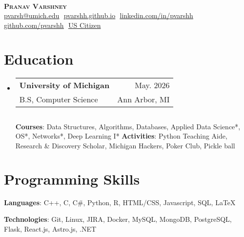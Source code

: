 \documentclass[letterpaper,11pt]{article}
\makeatletter
\newcommand{\resumeSubheading}[4]{
  \vspace{-2pt}\item
    \begin{tabular*}{0.97\textwidth}[t]{l@{\extracolsep{\fill}}r}
      \textbf{#1} & #2 \\
      {\small#3} & {\small #4} \\
    \end{tabular*}\vspace{-7pt}
}
\newcommand{\resumeSubHeadingListStart}{\begin{itemize}[leftmargin=0.15in, 
label={}]}
\newcommand{\resumeSubHeadingListEnd}{\end{itemize}}
\makeatother
\begin{document}

\begin{center}
\textbf{} \\ \vspace{2pt}
    \textbf{\Huge \scshape Pranav Varshney} \\ \vspace{4pt}
    \small 
    \href{mailto:pvarsh@umich.edu}
    {\underline{pvarsh@umich.edu}} $ $
    \href{https://portfolio-pvarshhs-projects.vercel.app/}
    {\underline{pvarshh.github.io}} $  $
    \href{https://linkedin.com/in/pvarshh}
    {\underline{linkedin.com/in/pvarshh}} $ $
    \href{https://github.com/pvarshh}
    {\underline{github.com/pvarshh}} $ $
    {\underline{US Citizen}} $ $
\end{center}


\section{Education}
  \resumeSubHeadingListStart
    \resumeSubheading
      {University of Michigan}{May. 2026}
      {B.S, Computer Science}{Ann Arbor, MI} $ $

        \textbf{Courses}: Data Structures, Algorithms, Databases, Applied 
Data Science*, OS*, Networks*, Deep Learning I*
        \textbf{Activities}: Python Teaching Aide, Research \& Discovery 
Scholar, Michigan Hackers, Poker Club, Pickle ball

      \vspace{-2pt}
  \resumeSubHeadingListEnd

\section{Programming Skills}
 \begin{itemize}[leftmargin=0.15in, label={}]
    \small{\item{

     \textbf{Languages}{: C++, C, C\#, Python, R, HTML/CSS, Javascript, 
SQL, LaTeX} $ $

     \textbf{Technologies}{: Git, Linux, JIRA, Docker, MySQL, MongoDB, 
PostgreSQL, Flask, React.js, Astro.js, .NET } $ $
    
    }}
 \end{itemize}
\end{document}
